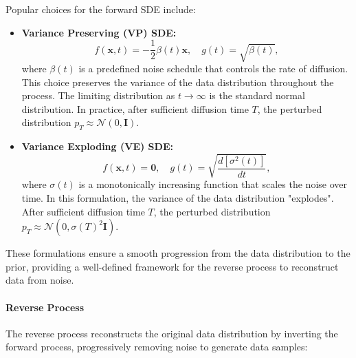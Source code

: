 \begin{itemize}
    Popular choices for the forward SDE include:
    
    \begin{itemize}
        \item \textbf{Variance Preserving (VP) SDE:}
        \[
        f(\mathbf{x}, t) = -\frac{1}{2} \beta(t) \mathbf{x}, \quad g(t) = \sqrt{\beta(t)},
        \]
        where \( \beta(t) \) is a predefined noise schedule that controls the rate of diffusion. This choice preserves the variance of the data distribution throughout the process. The limiting distribution as \( t \to \infty \) is the standard normal distribution. In practice, after sufficient diffusion time $T$, the perturbed distribution $p_T \approx \mathcal{N}(0, \mathbf{I})$.
    
        \item \textbf{Variance Exploding (VE) SDE:}
        \[
        f(\mathbf{x}, t) = \mathbf{0}, \quad g(t) = \sqrt{\frac{d[\sigma^2(t)]}{dt}},
        \]
        where \( \sigma(t) \) is a monotonically increasing function that scales the noise over time. In this formulation, the variance of the data distribution "explodes". After sufficient diffusion time $T$, the perturbed distribution $p_T \approx \mathcal{N}(0, \sigma(T)^2\mathbf{I}).$
    \end{itemize}

\end{itemize}

These formulations ensure a smooth progression from the data distribution to the prior, providing a well-defined framework for the reverse process to reconstruct data from noise.


\paragraph{Reverse Process}

The reverse process reconstructs the original data distribution by inverting the forward process, progressively removing noise to generate data samples:

